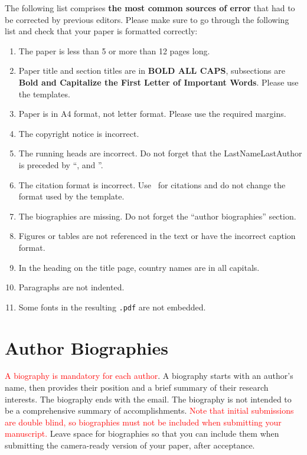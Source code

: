\documentclass{article}
\begin{document}
The following list comprises \textbf{the most common sources of error} that had to be corrected by previous editors. Please make sure to go through the following list and check that your paper is formatted correctly:
\begin{enumerate}
	\item	The paper is less than 5 or more than 12 pages long.
	\item	Paper title and section titles are in \textbf{BOLD ALL CAPS}, subsections are \textbf{Bold and Capitalize the First Letter of Important Words}. Please use the templates.
	\item	Paper is in A4 format, not letter format. Please use the required margins.
	\item	The copyright notice is incorrect.
	\item	The running heads are incorrect. Do not forget that the LastNameLastAuthor is preceded by ``, and ''.
	\item	The citation format is incorrect. Use \BibTeX\ for citations and do not change the format used by the template.
	\item	The biographies are missing. Do not forget the ``author biographies'' section.
	\item	Figures or tables are not referenced in the text or have the incorrect caption format.
	\item In the heading on the title page, country names are in all capitals.
	\item	Paragraphs are not indented.
	\item Some fonts in the resulting \texttt{.pdf} are not embedded.
\end{enumerate}






\section*{Author Biographies}

\textcolor{red}{A biography is mandatory for each author}. A biography starts with an author's name, then provides their position and a brief summary of their research interests. The biography ends with the email. The biography is not intended to be a comprehensive summary of accomplishments. \textcolor{red}{Note that initial submissions are double blind, so biographies must not be included when submitting your manuscript.} Leave space for biographies so that you can include them when submitting the camera-ready version of your paper, after acceptance.
\end{document}
